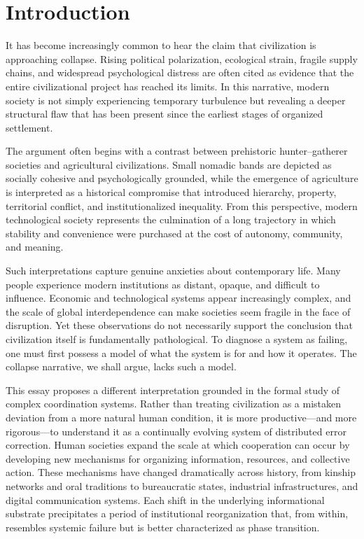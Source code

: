 \documentclass[12pt]{article}
\begin{document}
\newpage
\section{Introduction}

It has become increasingly common to hear the claim that civilization is approaching collapse. Rising political polarization, ecological strain, fragile supply chains, and widespread psychological distress are often cited as evidence that the entire civilizational project has reached its limits. In this narrative, modern society is not simply experiencing temporary turbulence but revealing a deeper structural flaw that has been present since the earliest stages of organized settlement.

The argument often begins with a contrast between prehistoric hunter--gatherer societies and agricultural civilizations. Small nomadic bands are depicted as socially cohesive and psychologically grounded, while the emergence of agriculture is interpreted as a historical compromise that introduced hierarchy, property, territorial conflict, and institutionalized inequality. From this perspective, modern technological society represents the culmination of a long trajectory in which stability and convenience were purchased at the cost of autonomy, community, and meaning.

Such interpretations capture genuine anxieties about contemporary life. Many people experience modern institutions as distant, opaque, and difficult to influence. Economic and technological systems appear increasingly complex, and the scale of global interdependence can make societies seem fragile in the face of disruption. Yet these observations do not necessarily support the conclusion that civilization itself is fundamentally pathological. To diagnose a system as failing, one must first possess a model of what the system is for and how it operates. The collapse narrative, we shall argue, lacks such a model.

This essay proposes a different interpretation grounded in the formal study of complex coordination systems. Rather than treating civilization as a mistaken deviation from a more natural human condition, it is more productive---and more rigorous---to understand it as a continually evolving system of distributed error correction. Human societies expand the scale at which cooperation can occur by developing new mechanisms for organizing information, resources, and collective action. These mechanisms have changed dramatically across history, from kinship networks and oral traditions to bureaucratic states, industrial infrastructures, and digital communication systems. Each shift in the underlying informational substrate precipitates a period of institutional reorganization that, from within, resembles systemic failure but is better characterized as phase transition.
\end{document}
